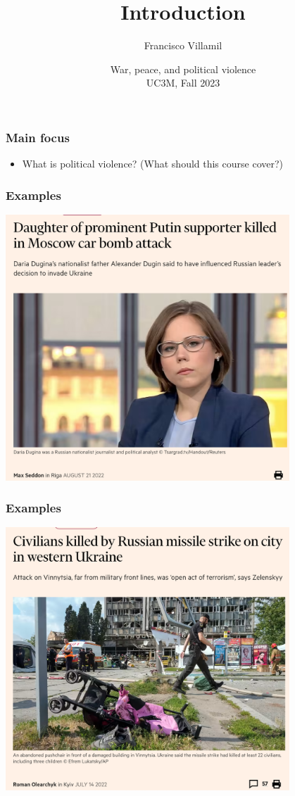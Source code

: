 \documentclass[aspectratio=43]{beamer}
\title{\Huge Introduction}
\author{Francisco Villamil}
\date{War, peace, and political violence\\UC3M, Fall 2023}
\begin{document}
\begin{frame}
  \titlepage
\end{frame}

\begin{frame}
\frametitle{Main focus}
\centering

\begin{itemize}
\item What is political violence? (What should this course cover?)
\end{itemize}

\end{frame}

\begin{frame}
\frametitle{Examples}
\centering

\includegraphics[width = 0.8\textwidth]{img/ft_dugina}\\

\end{frame}

\begin{frame}
\frametitle{Examples}
\centering

\includegraphics[width = 0.8\textwidth]{img/ft_strike}\\

\end{frame}
\end{document}
